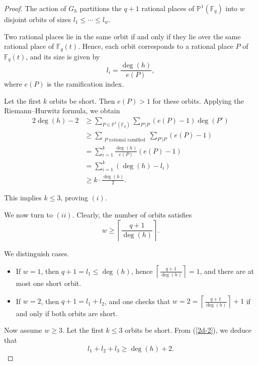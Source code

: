 \documentclass[1p,final]{elsarticle}
\newtheorem{open problem}[theorem]{Open Problem}
\begin{document}
\begin{proof}
The action of $G_{h}$ partitions the $q+1$ rational places of $\mathbb{P}^{1}(\mathbb{F}_{q})$ into $w$ disjoint orbits of sizes $l_{1}\le \cdots \le l_{w}$.

\medskip

Two rational places lie in the same orbit if and only if they lie over the same rational place of $\mathbb{F}_{q}(t)$. Hence, each orbit corresponds to a rational place $P$ of $\mathbb{F}_{q}(t)$, and its size is given by
\[
l_i = \frac{\deg(h)}{e(P)},
\]
where $e(P)$ is the ramification index.

\medskip

Let the first $k$ orbits be short. Then $e(P)>1$ for these orbits. Applying the Riemann--Hurwitz formula, we obtain
\begin{equation}\label{2d-2}
\begin{aligned}
2\deg(h)-2
&\ge
\sum_{P\in \mathbb{P}^{1}(\mathbb{F}_{q}) }\sum_{P'|P}(e(P)-1)\deg(P') \\
&\ge
\sum_{\substack{P \text{ rational ramified}}}
\sum_{P'|P}(e(P)-1) \\
&=
\sum_{i=1}^{k}\frac{\deg(h)}{e(P)}(e(P)-1) \\
&=
\sum_{i=1}^{k}\left ( \deg(h)-l_{i}\right ) \\
&\ge
k\cdot\frac{\deg(h)}{2}.
\end{aligned}
\end{equation}

This implies $k\le 3$, proving $(i)$.

\medskip

We now turn to $(ii)$. Clearly, the number of orbits satisfies
\[
w \ge \left \lceil \frac{q+1}{\deg(h)} \right \rceil.
\]

We distinguish cases.

\begin{itemize}
\item If $w=1$, then $q+1=l_{1}\le \deg(h)$, hence $\left \lceil \frac{q+1}{\deg(h)} \right \rceil=1$, and there are at most one short orbit.

\item If $w=2$, then $q+1=l_{1}+l_{2}$, and one checks that $w=2=\left \lceil \frac{q+1}{\deg(h)} \right \rceil+1$ if and only if both orbits are short.
\end{itemize}

Now assume $w\ge 3$. Let the first $k\le 3$ orbits be short. From (\ref{2d-2}), we deduce that
\[
l_{1}+l_{2}+l_{3}\ge \deg(h)+2.
\]


\end{proof}
\end{document}
